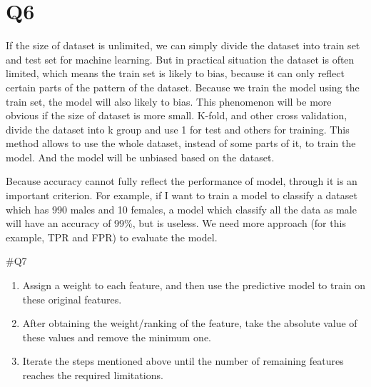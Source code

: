 \documentclass[]{article}
\begin{document}
\hypertarget{q6}{%
\section{Q6}\label{q6}}

If the size of dataset is unlimited, we can simply divide the dataset
into train set and test set for machine learning. But in practical
situation the dataset is often limited, which means the train set is
likely to bias, because it can only reflect certain parts of the pattern
of the dataset. Because we train the model using the train set, the
model will also likely to bias. This phenomenon will be more obvious if
the size of dataset is more small. K-fold, and other cross validation,
divide the dataset into k group and use 1 for test and others for
training. This method allows to use the whole dataset, instead of some
parts of it, to train the model. And the model will be unbiased based on
the dataset.

Because accuracy cannot fully reflect the performance of model, through
it is an important criterion. For example, if I want to train a model to
classify a dataset which has 990 males and 10 females, a model which
classify all the data as male will have an accuracy of 99\%, but is
useless. We need more approach (for this example, TPR and FPR) to
evaluate the model.

\#Q7

\begin{enumerate}
\def\labelenumi{\arabic{enumi}.}
\item
  Assign a weight to each feature, and then use the predictive model to
  train on these original features.
\item
  After obtaining the weight/ranking of the feature, take the absolute
  value of these values and remove the minimum one.
\item
  Iterate the steps mentioned above until the number of remaining
  features reaches the required limitations.
\end{enumerate}
\end{document}
